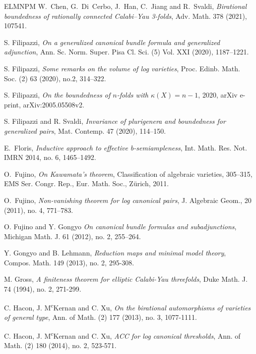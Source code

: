 \documentclass{amsart}[12pt,a4paper]
\theoremstyle{definition}
\begin{document}
\begin{thebibliography}{ELMNPM}
W.~Chen, G.~Di~Cerbo, J.~Han, C.~Jiang and R.~Svaldi,
\textit{Birational boundedness of rationally connected Calabi--Yau 3-folds},
Adv. Math. 378 (2021), 107541.

 S. Filipazzi, \textit{On a generalized canonical bundle formula and generalized adjunction}, 
Ann. Sc. Norm. Super. Pisa Cl. Sci. (5)
Vol. XXI (2020), 1187--1221.

 S. Filipazzi, \textit{Some remarks on the volume of log varieties},
Proc. Edinb. Math. Soc. (2) 63 (2020), no.2, 314--322.

 S. Filipazzi, \textit{On the boundedness of $n$-folds with $\kappa(X)=n-1$}, 2020,
arXiv e-print, 
arXiv:2005.05508v2.

S. Filipazzi and R. Svaldi, \textit{Invariance of plurigenera and boundedness for generalized pairs}, Mat. Contemp. 47 (2020), 114--150.

E.~Floris,
\textit{Inductive approach to effective b-semiampleness},
Int. Math. Res. Not. IMRN 2014, no. 6, 1465--1492.

 O.~Fujino, \textit{On Kawamata's theorem}, Classification of algebraic varieties, 305--315, EMS Ser. Congr. Rep., Eur. Math. Soc., Z\"{u}rich, 2011.

O.~Fujino, \textit{Non-vanishing theorem for log canonical pairs}, 
J. Algebraic Geom., 20 (2011), no. 4, 771--783.

 O. Fujino and Y. Gongyo
\textit{On canonical bundle formulas and subadjunctions},
Michigan Math. J. 61 (2012), no. 2, 255--264. 

 Y. Gongyo and B. Lehmann, \textit{Reduction maps and minimal model theory}, 
Compos. Math. 149 (2013), no. 2, 295-308. 

 M. Gross, \textit{A finiteness theorem for elliptic Calabi-Yau threefolds}, 
Duke Math. J. 74 (1994), no. 2, 271-299. 

 C. Hacon, J. M\textsuperscript{c}Kernan and C. Xu, \textit{On the birational automorphisms of varieties of general type},  Ann. of Math. (2) 177 (2013), no. 3, 1077-1111. 

C. Hacon, J. M\textsuperscript{c}Kernan and C. Xu, 
\textit{ACC for log canonical thresholds},
Ann. of Math. (2) 180 (2014), no. 2, 523-571.


\end{thebibliography}
\end{document}
